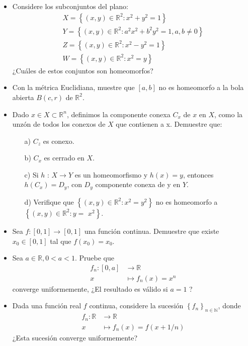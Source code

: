 \begin{itemize}
\item Considere los subconjuntos del plano:
$$
\begin{gathered}
X=\left\{(x, y) \in \mathbb{R}^2: x^2+y^2=1\right\} \\
Y=\left\{(x, y) \in \mathbb{R}^2: a^2 x^2+b^2 y^2=1, a, b \neq 0\right\} \\
Z=\left\{(x, y) \in \mathbb{R}^2: x^2-y^2=1\right\} \\
W=\left\{(x, y) \in \mathbb{R}^2: x^2=y\right\}
\end{gathered}
$$
¿Cuáles de estos conjuntos son homeomorfos?

\item Con la métrica Euclidiana, muestre que $[a, b]$ no es homeomorfo a la bola abierta $B(c, r)$ de $\mathbb{R}^2$.

\item Dado $x \in X \subset \mathbb{R}^n$, definimos la componente conexa $C_x$ de $x$ en $X$, como la unzón de todos los conexos de $X$ que contienen a x. Demuestre que:

\begin{itemize}
    \item [a)] $C_z$ es conexo.

    \item[b)] $C_x$ es cerrado en $X$.

    \item[c)] Si $h$ : $X \rightarrow Y$ es un homeomorfismo y $h(x)=y$, entonces $h\left(C_x\right)=D_y$, con $D_y$ componente conexa de y en $Y$.

    \item[d)] Verifique que $\left\{(x, y) \in \mathbb{R}^2: x^2=y^2\right\}$ no es homeomorfo a $\left\{(x, y) \in \mathbb{R}^2: y=\right.$ $\left.x^2\right\}$.
\end{itemize}

\item Sea $f:[0,1] \rightarrow[0,1]$ una función continua. Demuestre que existe $x_0 \in[0,1]$ tal que $f\left(x_0\right)=x_0$.

\item Sea $a \in \mathbb{R}, 0<a<1$. Pruebe que
$$
\begin{aligned}
f_n:[0, a] & \rightarrow \mathbb{R} \\
x & \mapsto f_n(x)=x^n
\end{aligned}
$$
converge uniformemente, ¿El resultado es válido si $a=1$ ?

\item Dada una función real $f$ continua, considere la sucesión $\left\{f_n\right\}_{n \in \mathbb{N}}$, donde
$$
\begin{aligned}
f_n: \mathbb{R} & \rightarrow \mathbb{R} \\
x & \mapsto f_n(x)=f(x+1 / n)
\end{aligned}
$$
¿Esta sucesión converge uniformemente?


\end{itemize}
